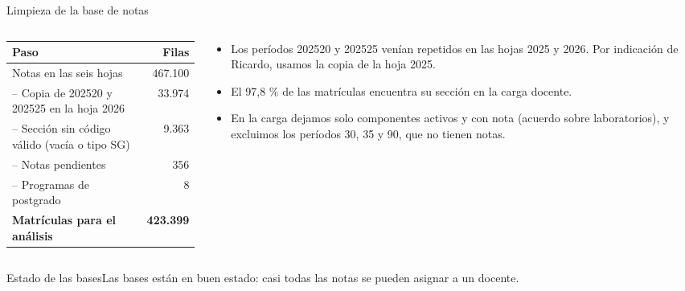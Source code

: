 \documentclass[10pt,aspectratio=169]{beamer}
\newcommand{\sintesis}[2]{%
  \begin{block}{#1}#2\end{block}}
\begin{document}
\begin{frame}{Limpieza de la base de notas}
  \begin{columns}[c]
    \begin{column}{0.55\textwidth}
      \begin{table}\small
        \begin{tabular}{lr}
          \toprule
          Paso & Filas \\
          \midrule
          Notas en las seis hojas & 467.100 \\
          -- Copia de 202520 y 202525 en la hoja 2026 & 33.974 \\
          -- Sección sin código válido (vacía o tipo SG) & 9.363 \\
          -- Notas pendientes & 356 \\
          -- Programas de postgrado & 8 \\
          \midrule
          \textbf{Matrículas para el análisis} & \textbf{423.399} \\
          \bottomrule
        \end{tabular}
      \end{table}
    \end{column}
    \begin{column}{0.43\textwidth}\small
      \begin{itemize}
        \item Los períodos 202520 y 202525 venían repetidos en las hojas 2025 y 2026. Por indicación de Ricardo, usamos la copia de la hoja 2025.
        \item \alert{El 97,8 \%} de las matrículas encuentra su sección en la carga docente.
        \item En la carga dejamos solo componentes activos y con nota (acuerdo sobre laboratorios), y excluimos los períodos 30, 35 y 90, que no tienen notas.
      \end{itemize}
    \end{column}
  \end{columns}
  \vspace{0.4em}
  \sintesis{Estado de las bases}{Las bases están en buen estado: casi todas las notas se pueden asignar a un docente.}
\end{frame}
\end{document}
